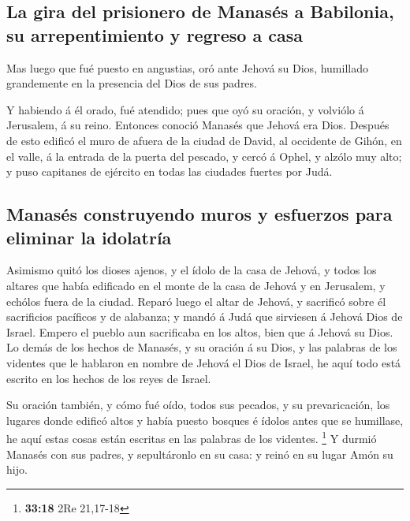\hypertarget{la-gira-del-prisionero-de-manasuxe9s-a-babilonia-su-arrepentimiento-y-regreso-a-casa}{%
\subsection{La gira del prisionero de Manasés a Babilonia, su
arrepentimiento y regreso a
casa}\label{la-gira-del-prisionero-de-manasuxe9s-a-babilonia-su-arrepentimiento-y-regreso-a-casa}}

 Mas luego que fué puesto en angustias, oró ante Jehová su
Dios, humillado grandemente en la presencia del Dios de sus padres.

 Y habiendo á él orado, fué atendido; pues que oyó su
oración, y volviólo á Jerusalem, á su reino. Entonces conoció Manasés
que Jehová era Dios.  Después de esto edificó el muro de
afuera de la ciudad de David, al occidente de Gihón, en el valle, á la
entrada de la puerta del pescado, y cercó á Ophel, y alzólo muy alto; y
puso capitanes de ejército en todas las ciudades fuertes por Judá.

\hypertarget{manasuxe9s-construyendo-muros-y-esfuerzos-para-eliminar-la-idolatruxeda}{%
\subsection{Manasés construyendo muros y esfuerzos para eliminar la
idolatría}\label{manasuxe9s-construyendo-muros-y-esfuerzos-para-eliminar-la-idolatruxeda}}

 Asimismo quitó los dioses ajenos, y el ídolo de la casa de
Jehová, y todos los altares que había edificado en el monte de la casa
de Jehová y en Jerusalem, y echólos fuera de la ciudad. 
Reparó luego el altar de Jehová, y sacrificó sobre él sacrificios
pacíficos y de alabanza; y mandó á Judá que sirviesen á Jehová Dios de
Israel.  Empero el pueblo aun sacrificaba en los altos,
bien que á Jehová su Dios.  Lo demás de los hechos de
Manasés, y su oración á su Dios, y las palabras de los videntes que le
hablaron en nombre de Jehová el Dios de Israel, he aquí todo está
escrito en los hechos de los reyes de Israel.

 Su oración también, y cómo fué oído, todos sus pecados, y
su prevaricación, los lugares donde edificó altos y había puesto bosques
é ídolos antes que se humillase, he aquí estas cosas están escritas en
las palabras de los videntes. \footnote{\textbf{33:18} 2Re 21,17-18}
 Y durmió Manasés con sus padres, y sepultáronlo en su
casa: y reinó en su lugar Amón su hijo.

